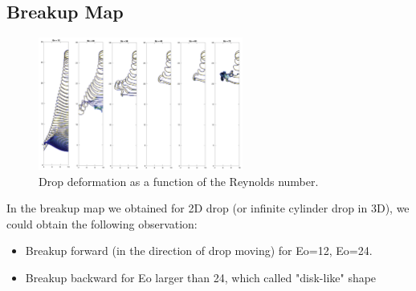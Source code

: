 \documentclass[12pt]{article}
\begin{document}






\subsection{Breakup Map}

\begin{figure}[H]
    \centering
    \includegraphics[width=0.6\textwidth]{Latex/figures/Eo_effect.jpg}
    \caption{Drop deformation as a function of the Reynolds number.}
    \label{deformation}
\end{figure}

In the breakup map we obtained for 2D drop (or infinite cylinder drop in 3D), we could obtain the following observation:
\begin{itemize}
    \item Breakup forward (in the direction of drop moving) for Eo=12, Eo=24.
    \item Breakup backward for Eo larger than 24, which called "disk-like" shape
\end{itemize}
\end{document}
